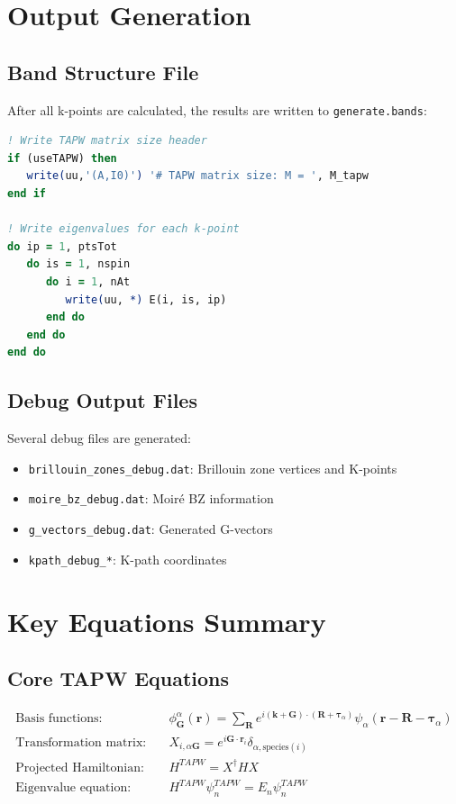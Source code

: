 \documentclass[11pt,a4paper]{article}
\begin{document}
\section{Output Generation}

\subsection{Band Structure File}

After all k-points are calculated, the results are written to \texttt{generate.bands}:

\begin{lstlisting}[language=Fortran,caption=Band Output]
! Write TAPW matrix size header
if (useTAPW) then
   write(uu,'(A,I0)') '# TAPW matrix size: M = ', M_tapw
end if

! Write eigenvalues for each k-point
do ip = 1, ptsTot
   do is = 1, nspin
      do i = 1, nAt
         write(uu, *) E(i, is, ip)
      end do
   end do
end do
\end{lstlisting}

\subsection{Debug Output Files}

Several debug files are generated:
\begin{itemize}
    \item \texttt{brillouin\_zones\_debug.dat}: Brillouin zone vertices and K-points
    \item \texttt{moire\_bz\_debug.dat}: Moiré BZ information
    \item \texttt{g\_vectors\_debug.dat}: Generated G-vectors
    \item \texttt{kpath\_debug\_*}: K-path coordinates
\end{itemize}

\section{Key Equations Summary}

\subsection{Core TAPW Equations}

\begin{align}
\text{Basis functions:} \quad & \phi^{\alpha}_{\mathbf{G}}(\mathbf{r}) = \sum_{\mathbf{R}} e^{i(\mathbf{k} + \mathbf{G}) \cdot (\mathbf{R} + \boldsymbol{\tau}_\alpha)} \psi_\alpha(\mathbf{r} - \mathbf{R} - \boldsymbol{\tau}_\alpha) \\
\text{Transformation matrix:} \quad & X_{i,\alpha\mathbf{G}} = e^{i\mathbf{G} \cdot \mathbf{r}_i} \delta_{\alpha,\text{species}(i)} \\
\text{Projected Hamiltonian:} \quad & H^{TAPW} = X^\dagger H X \\
\text{Eigenvalue equation:} \quad & H^{TAPW} \psi^{TAPW}_n = E_n \psi^{TAPW}_n
\end{align}
\end{document}
